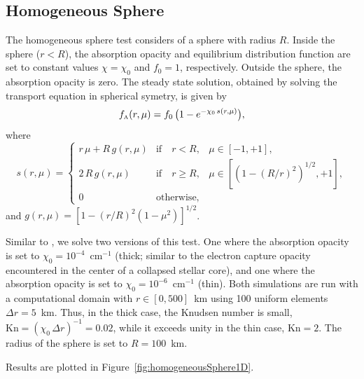 \documentclass[10pt,preprint]{aastex}
\begin{document}
\subsection{Homogeneous Sphere}

The homogeneous sphere test \citep[cf.][]{smit_etal_1997} considers of a sphere with radius $R$.  
Inside the sphere ($r<R$), the absorption opacity and equilibrium distribution function are set to constant values $\chi=\chi_{0}$ and $f_{0}=1$, respectively.  
Outside the sphere, the absorption opacity is zero.  
The steady state solution, obtained by solving the transport equation in spherical symetry, is given by
\begin{equation}
  f_{\mbox{\tiny A}}(r,\mu)=f_{0}\,\big(1-e^{-\chi_{0}\,s(r,\mu)}\big),
  \label{distributionHomogeneousSphere}
\end{equation}
where
\begin{equation}
  s(r,\mu)
  =\left\{
  \begin{array}{lll}
    r\,\mu+R\,g(r,\mu) & \mbox{if}\quad r<R, & \mu\in[-1,+1], \\
    2\,R\,g(r,\mu) & \mbox{if}\quad r \ge R, & \mu\in[(1-(R/r)^{2})^{1/2},+1], \\
    0 & \mbox{otherwise},
  \end{array}
  \right.
\end{equation}
and $g(r,\mu)=[1-(r/R)^{2}(1-\mu^{2})]^{1/2}$.  

Similar to \citet{oConnor_2015}, we solve two versions of this test.  
One where the absorption opacity is set to $\chi_{0}=10^{-4}$~cm$^{-1}$ (thick; similar to the electron capture opacity encountered in the center of a collapsed stellar core), and one where the absorption opacity is set to $\chi_{0}=10^{-6}$~cm$^{-1}$ (thin).  
Both simulations are run with a computational domain with $r\in[0,500]$~km using 100 uniform elements $\Delta r=5$~km.  
Thus, in the thick case, the Knudsen number is small, $\mbox{Kn}=(\chi_{0}\,\Delta r)^{-1}=0.02$, while it exceeds unity in the thin case, $\mbox{Kn}=2$.  
The radius of the sphere is set to $R=100$~km.  

Results are plotted in Figure~\ref{fig:homogeneousSphere1D}.  
\end{document}
